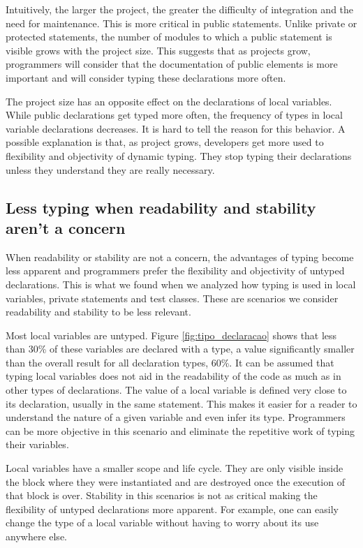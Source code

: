 \documentclass[preprint]{sigplanconf}
\begin{document}
Intuitively, the larger the project, the greater the difficulty of integration and the need for maintenance.
This is more critical in public statements.
Unlike private or protected statements, the number of modules to which a public statement is visible grows with the project size.
This suggests that as projects grow, programmers will consider that the documentation of public elements is more important and will consider typing these declarations more often.

The project size has an opposite effect on the declarations of local variables.
While public declarations get typed more often, the frequency of types in local variable declarations decreases.
It is hard to tell the reason for this behavior.
A possible explanation is that, as project grows, developers get more used to flexibility and objectivity of dynamic typing.
They stop typing their declarations unless they understand they are really necessary.

\subsection{Less typing when readability and stability aren't a concern}
When readability or stability are not a concern, the advantages of typing become less apparent and  programmers prefer the flexibility and objectivity of untyped declarations.
This is what we found when we analyzed how typing is used in local variables, private statements and test classes.
These are scenarios we consider readability and stability to be less relevant.

Most local variables are untyped.
Figure \ref{fig:tipo_declaracao} shows that less than 30\% of these variables are declared with a type, a value significantly smaller than the overall result for all declaration types, 60\%.
It can be assumed that typing local variables does not aid in the readability of the code as much as in other types of declarations.
The value of a local variable is defined very close to its declaration, usually in the same statement.
This makes it easier for a reader to understand the nature of a given variable and even infer its type.
Programmers can be more objective in this scenario and eliminate the repetitive work of typing their variables.

Local variables have a smaller scope and life cycle.
They are only visible inside the block where they were instantiated and are destroyed once the execution of that block is over.
Stability in this scenarios is not as critical making the flexibility of untyped declarations more apparent.
For example, one can easily change the type of a local variable without having to worry about its use anywhere else.
\end{document}
